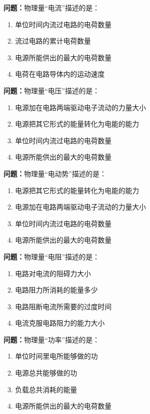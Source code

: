 \bigskip


\noindent\textbf{问题：}物理量“电流”描述的是：
\begin{enumerate}[label=\Alph*), leftmargin=3em]
\item 单位时间内流过电路的电荷数量
\item 流过电路的累计电荷数量
\item 电源所能供出的最大的电荷数量
\item 电荷在电路导体内的运动速度
\end{enumerate}

\bigskip


\noindent\textbf{问题：}物理量“电压”描述的是：
\begin{enumerate}[label=\Alph*), leftmargin=3em]
\item 电源加在电路两端驱动电子流动的力量大小
\item 电源把其它形式的能量转化为电能的能力
\item 单位时间内流过电路的电荷数量
\item 电源所能供出的最大的电荷数量
\end{enumerate}

\bigskip


\noindent\textbf{问题：}物理量“电动势”描述的是：
\begin{enumerate}[label=\Alph*), leftmargin=3em]
\item 电源把其它形式的能量转化为电能的能力
\item 电源加在电路两端驱动电子流动的力量大小
\item 单位时间内流过电路的电荷数量
\item 电源所能供出的最大的电荷数量
\end{enumerate}

\bigskip


\noindent\textbf{问题：}物理量“电阻”描述的是：
\begin{enumerate}[label=\Alph*), leftmargin=3em]
\item 电路对电流的阻碍力大小
\item 电路阻力所消耗的能量多少
\item 电路阻断电流所需要的过度时间
\item 电流克服电路阻力的能力大小
\end{enumerate}

\bigskip


\noindent\textbf{问题：}物理量“功率”描述的是：
\begin{enumerate}[label=\Alph*), leftmargin=3em]
\item 单位时间里电所能够做的功
\item 电源总共能够做的功
\item 负载总共消耗的能量
\item 电源所能供出的最大的电荷数量
\end{enumerate}

